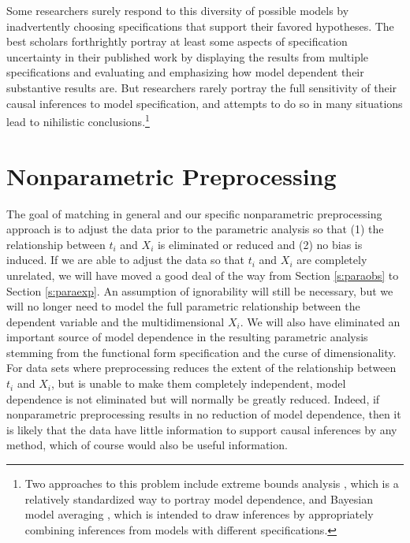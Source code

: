 \documentclass[11pt,titlepage]{article}
\begin{document}
Some researchers surely respond to this diversity of possible models
by inadvertently choosing specifications that support their favored
hypotheses.  The best scholars forthrightly portray at least some
aspects of specification uncertainty in their published work by
displaying the results from multiple specifications and evaluating and
emphasizing how model dependent their substantive results are.  But
researchers rarely portray the full sensitivity of their causal
inferences to model specification, and attempts to do so in many
situations lead to nihilistic conclusions.\footnote{Two approaches to
  this problem include extreme bounds analysis \citep{Leamer78}, which
  is a relatively standardized way to portray model dependence, and
  Bayesian model averaging \citep{HoeMadRaf99,ImaKin04}, which is
  intended to draw inferences by appropriately combining inferences
  from models with different specifications.}

\section{Nonparametric Preprocessing}

The goal of matching in general and our specific nonparametric
preprocessing approach is to adjust the data prior to the parametric
analysis so that (1) the relationship between $t_i$ and $X_i$ is
eliminated or reduced and (2) no bias is induced.  If we are able to
adjust the data so that $t_i$ and $X_i$ are completely unrelated, we
will have moved a good deal of the way from Section \ref{s:paraobs} to
Section \ref{s:paraexp}.  An assumption of ignorability will still be
necessary, but we will no longer need to model the full parametric
relationship between the dependent variable and the multidimensional
$X_i$.  We will also have eliminated an important source of model
dependence in the resulting parametric analysis stemming from the
functional form specification and the curse of dimensionality.  For
data sets where preprocessing reduces the extent of the relationship
between $t_i$ and $X_i$, but is unable to make them completely
independent, model dependence is not eliminated but will normally be
greatly reduced.  Indeed, if nonparametric preprocessing results in no
reduction of model dependence, then it is likely that the data have
little information to support causal inferences by any method, which
of course would also be useful information.
\end{document}
